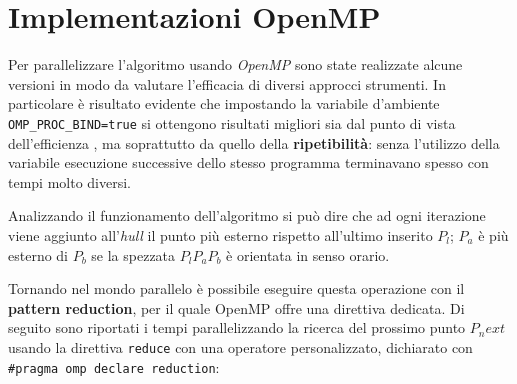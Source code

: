 \section{Implementazioni OpenMP}
Per parallelizzare l'algoritmo usando \emph{OpenMP} sono state realizzate alcune versioni in modo da valutare l'efficacia di diversi approcci strumenti.
In particolare è risultato evidente che impostando la variabile d'ambiente \texttt{OMP_PROC_BIND=true} si ottengono risultati migliori sia dal punto di vista dell'efficienza , ma soprattutto da quello della \textbf{ripetibilità}: senza l'utilizzo della variabile esecuzione successive dello stesso programma terminavano spesso con tempi molto diversi.

Analizzando il funzionamento dell'algoritmo si può dire che ad ogni iterazione viene aggiunto all'\emph{hull} il punto più esterno rispetto all'ultimo inserito $P_l$;
$P_a$ è più esterno di $P_b$ se la spezzata $P_lP_aP_b$ è orientata in senso orario.

Tornando nel mondo parallelo è possibile eseguire questa operazione con il \textbf{pattern reduction}, per il quale OpenMP offre una direttiva dedicata.
Di seguito sono riportati i tempi parallelizzando la ricerca del prossimo punto $P_next$ usando la direttiva \texttt{reduce} con una operatore personalizzato,
dichiarato con \texttt{\#pragma omp declare reduction}:

